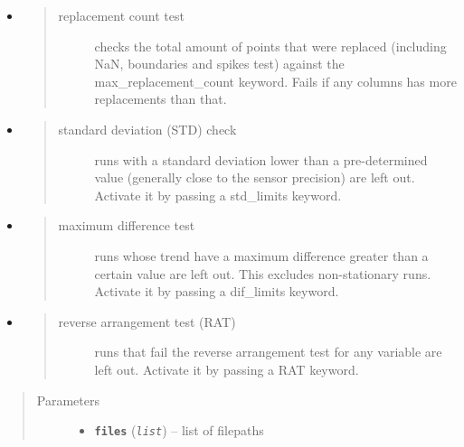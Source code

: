 \documentclass[a4paper,10pt,oneside]{sphinxmanual}
\begin{document}
\begin{fulllineitems}
\begin{itemize}
\begin{quote}
\begin{description}
\end{description}\end{quote}

\item {} \begin{quote}\begin{description}
\item[{replacement count test}] \leavevmode
checks the total amount of points that were replaced (including NaN, boundaries and spikes test)
against the max\_replacement\_count keyword. Fails if any columns has more replacements than that.

\end{description}\end{quote}

\item {} \begin{quote}\begin{description}
\item[{standard deviation (STD) check}] \leavevmode
runs with a standard deviation lower than a pre-determined value (generally close to the
sensor precision) are left out.
Activate it by passing a std\_limits keyword.

\end{description}\end{quote}

\item {} \begin{quote}\begin{description}
\item[{maximum difference test}] \leavevmode
runs whose trend have a maximum difference greater than a certain value are left out.
This excludes non-stationary runs. Activate it by passing a dif\_limits keyword.

\end{description}\end{quote}

\item {} \begin{quote}\begin{description}
\item[{reverse arrangement test (RAT)}] \leavevmode
runs that fail the reverse arrangement test for any variable are left out.
Activate it by passing a RAT keyword.

\end{description}\end{quote}

\end{itemize}
\begin{quote}\begin{description}
\item[{Parameters}] \leavevmode\begin{itemize}
\item {} 
\textbf{\texttt{files}} (\emph{\texttt{list}}) -- list of filepaths


\end{itemize}
\end{description}
\end{quote}
\end{fulllineitems}
\end{document}
